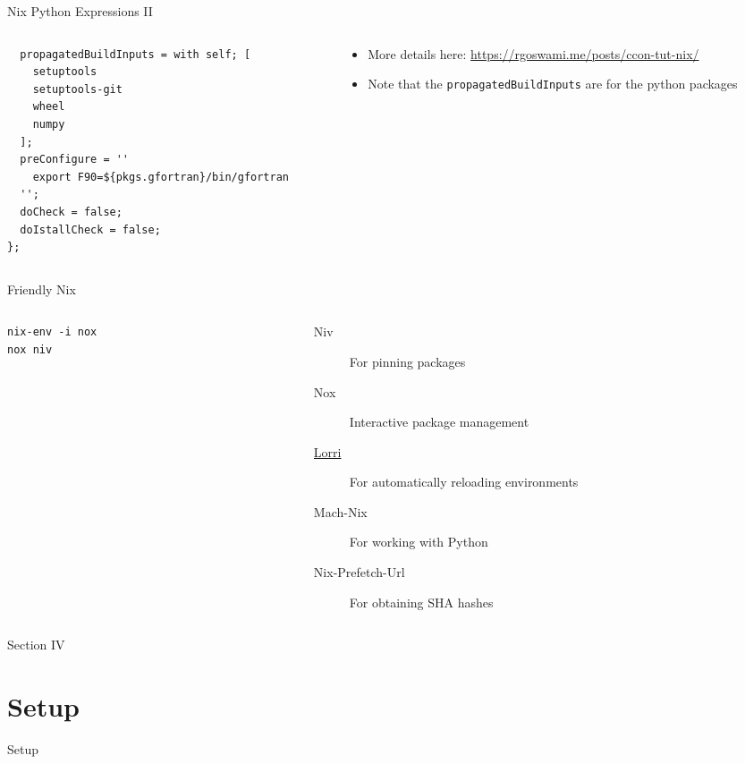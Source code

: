 \documentclass[bigger,unknownkeysallowed,aspectratio=169,red,colorblocks]{beamer}
\begin{document}
\begin{frame}[label={sec:org2f4df6e},fragile]{Nix Python Expressions II}
 \begin{columns}
\begin{column}{0.6\columnwidth}
\begin{verbatim}
  propagatedBuildInputs = with self; [
    setuptools
    setuptools-git
    wheel
    numpy
  ];
  preConfigure = ''
    export F90=${pkgs.gfortran}/bin/gfortran
  '';
  doCheck = false;
  doIstallCheck = false;
};
\end{verbatim}
\end{column}
\begin{column}{0.4\columnwidth}
\begin{itemize}
\item More details here: \url{https://rgoswami.me/posts/ccon-tut-nix/}
\item Note that the \texttt{propagatedBuildInputs} are for the python packages
\end{itemize}
\end{column}
\end{columns}
\end{frame}
\begin{frame}[label={sec:org5c692ad},fragile]{Friendly Nix}
 \begin{columns}
\begin{column}{0.4\columnwidth}
\begin{verbatim}
nix-env -i nox
nox niv
\end{verbatim}
\end{column}
\begin{column}{0.6\columnwidth}
\begin{description}
\item[{Niv}] For pinning packages
\item[{Nox}] Interactive package management
\item[{\href{https://github.com/target/lorri/}{Lorri}}] For automatically reloading environments
\item[{Mach-Nix}] For working with Python
\item[{Nix-Prefetch-Url}] For obtaining SHA hashes
\end{description}
\end{column}
\end{columns}
\end{frame}
\begin{frame}[label={sec:orgb4c1138},standout]{Section IV}
\section{Setup}
\begin{center}
  \Huge Setup
\end{center}
\end{frame}
\end{document}
